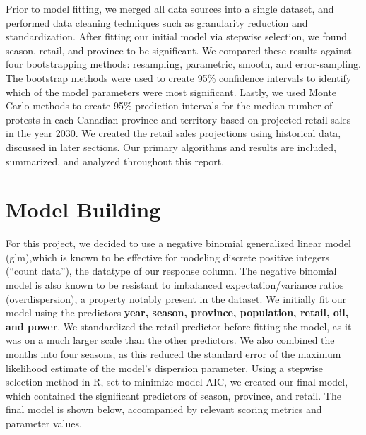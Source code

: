 \documentclass[12pt]{article}
\begin{document}
Prior to model fitting, we merged all data sources into a single dataset, and performed data cleaning techniques such as granularity reduction and standardization. After fitting our initial model via stepwise selection, we found season, retail, and province to be significant. We compared these results against four bootstrapping methods: resampling, parametric, smooth, and error-sampling. The bootstrap methods were used to create 95\% confidence intervals to identify which of the model parameters were most significant. Lastly, we used Monte Carlo methods to create 95\% prediction intervals for the median number of protests in each Canadian province and territory based on projected retail sales in the year 2030. We created the retail sales projections using historical data, discussed in later sections.
Our primary algorithms and results are included, summarized, and analyzed throughout this report.

\newpage
\section{Model Building}
For this project, we decided to use a negative binomial generalized linear model (glm),which is known to be effective for modeling discrete positive integers (``count data''), the datatype of our response column. The negative binomial model is also known to be resistant to imbalanced expectation/variance ratios (overdispersion), a property notably present in the dataset. We initially fit our model using the predictors \textbf{year, season, province, population, retail, oil, and power}. We standardized the retail predictor before fitting the model, as it was on a much larger scale than the other predictors. We also combined the months into four seasons, as this reduced the standard error of the maximum likelihood estimate of the model's dispersion parameter. Using a stepwise selection method in R, set to minimize model AIC, we created our final model, which contained the significant predictors of season, province, and retail. The final model is shown below, accompanied by relevant scoring metrics and parameter values.
\end{document}
